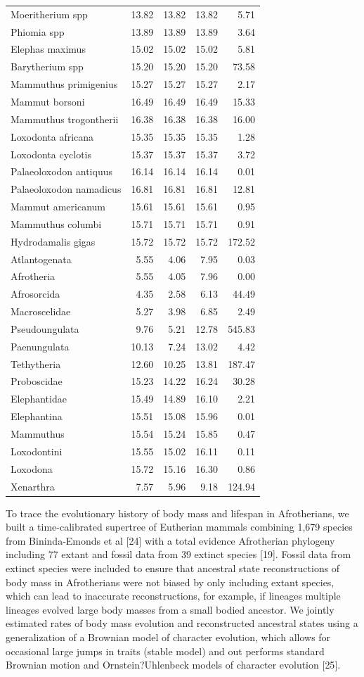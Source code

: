 \documentclass[10pt,letterpaper]{article}
\begin{document}
\begin{longtable}[]{@{}lrrrr@{}}
Moeritherium spp & 13.82 & 13.82 & 13.82 & 5.71\tabularnewline
Phiomia spp & 13.89 & 13.89 & 13.89 & 3.64\tabularnewline
Elephas maximus & 15.02 & 15.02 & 15.02 & 5.81\tabularnewline
Barytherium spp & 15.20 & 15.20 & 15.20 & 73.58\tabularnewline
Mammuthus primigenius & 15.27 & 15.27 & 15.27 & 2.17\tabularnewline
Mammut borsoni & 16.49 & 16.49 & 16.49 & 15.33\tabularnewline
Mammuthus trogontherii & 16.38 & 16.38 & 16.38 & 16.00\tabularnewline
Loxodonta africana & 15.35 & 15.35 & 15.35 & 1.28\tabularnewline
Loxodonta cyclotis & 15.37 & 15.37 & 15.37 & 3.72\tabularnewline
Palaeoloxodon antiquus & 16.14 & 16.14 & 16.14 & 0.01\tabularnewline
Palaeoloxodon namadicus & 16.81 & 16.81 & 16.81 & 12.81\tabularnewline
Mammut americanum & 15.61 & 15.61 & 15.61 & 0.95\tabularnewline
Mammuthus columbi & 15.71 & 15.71 & 15.71 & 0.91\tabularnewline
Hydrodamalis gigas & 15.72 & 15.72 & 15.72 & 172.52\tabularnewline
Atlantogenata & 5.55 & 4.06 & 7.95 & 0.03\tabularnewline
Afrotheria & 5.55 & 4.05 & 7.96 & 0.00\tabularnewline
Afrosorcida & 4.35 & 2.58 & 6.13 & 44.49\tabularnewline
Macroscelidae & 5.27 & 3.98 & 6.85 & 2.49\tabularnewline
Pseudoungulata & 9.76 & 5.21 & 12.78 & 545.83\tabularnewline
Paenungulata & 10.13 & 7.24 & 13.02 & 4.42\tabularnewline
Tethytheria & 12.60 & 10.25 & 13.81 & 187.47\tabularnewline
Proboscidae & 15.23 & 14.22 & 16.24 & 30.28\tabularnewline
Elephantidae & 15.49 & 14.89 & 16.10 & 2.21\tabularnewline
Elephantina & 15.51 & 15.08 & 15.96 & 0.01\tabularnewline
Mammuthus & 15.54 & 15.24 & 15.85 & 0.47\tabularnewline
Loxodontini & 15.55 & 15.02 & 16.11 & 0.11\tabularnewline
Loxodona & 15.72 & 15.16 & 16.30 & 0.86\tabularnewline
Xenarthra & 7.57 & 5.96 & 9.18 & 124.94\tabularnewline
\bottomrule
\end{longtable}

To trace the evolutionary history of body mass and lifespan in
Afrotherians, we built a time-calibrated supertree of Eutherian mammals
combining 1,679 species from Bininda-Emonds et al {[}24{]} with a total
evidence Afrotherian phylogeny including 77 extant and fossil data from
39 extinct species {[}19{]}. Fossil data from extinct species were
included to ensure that ancestral state reconstructions of body mass in
Afrotherians were not biased by only including extant species, which can
lead to inaccurate reconstructions, for example, if lineages multiple
lineages evolved large body masses from a small bodied ancestor. We
jointly estimated rates of body mass evolution and reconstructed
ancestral states using a generalization of a Brownian model of character
evolution, which allows for occasional large jumps in traits (stable
model) and out performs standard Brownian motion and Ornstein?Uhlenbeck
models of character evolution {[}25{]}.
\end{document}
